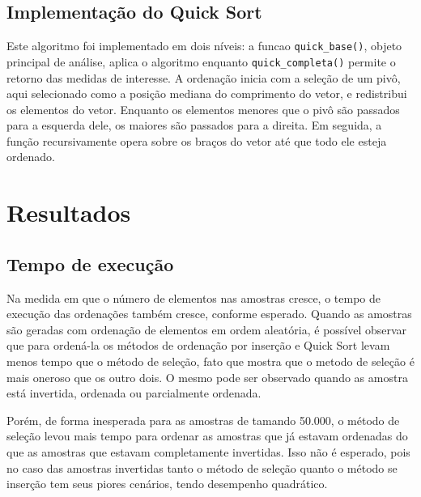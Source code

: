 \documentclass[
]{article}
\begin{document}
\hypertarget{implementauxe7uxe3o-do-quick-sort}{%
\subsection{Implementação do Quick
Sort}\label{implementauxe7uxe3o-do-quick-sort}}

Este algoritmo foi implementado em dois níveis: a funcao
\texttt{quick\_base()}, objeto principal de análise, aplica o algoritmo
enquanto \texttt{quick\_completa()} permite o retorno das medidas de
interesse. A ordenação inicia com a seleção de um pivô, aqui selecionado
como a posição mediana do comprimento do vetor, e redistribui os
elementos do vetor. Enquanto os elementos menores que o pivô são
passados para a esquerda dele, os maiores são passados para a direita.
Em seguida, a função recursivamente opera sobre os braços do vetor até
que todo ele esteja ordenado.

\hypertarget{resultados}{%
\section{Resultados}\label{resultados}}

\hypertarget{tempo-de-execuuxe7uxe3o}{%
\subsection{Tempo de execução}\label{tempo-de-execuuxe7uxe3o}}

Na medida em que o número de elementos nas amostras cresce, o tempo de
execução das ordenações também cresce, conforme esperado. Quando as
amostras são geradas com ordenação de elementos em ordem aleatória, é
possível observar que para ordená-la os métodos de ordenação por
inserção e Quick Sort levam menos tempo que o método de seleção, fato
que mostra que o metodo de seleção é mais oneroso que os outro dois. O
mesmo pode ser observado quando as amostra está invertida, ordenada ou
parcialmente ordenada.

Porém, de forma inesperada para as amostras de tamando 50.000, o método
de seleção levou mais tempo para ordenar as amostras que já estavam
ordenadas do que as amostras que estavam completamente invertidas. Isso
não é esperado, pois no caso das amostras invertidas tanto o método de
seleção quanto o método se inserção tem seus piores cenários, tendo
desempenho quadrático.
\end{document}
